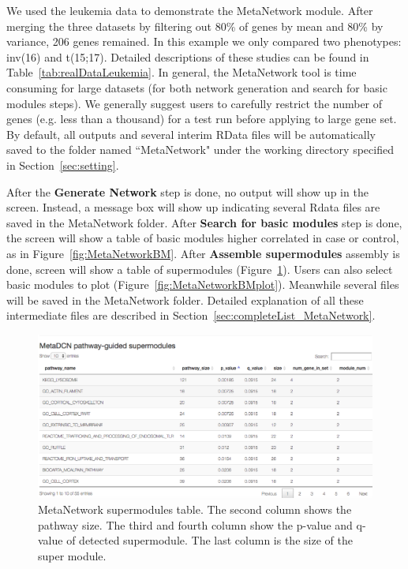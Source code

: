 We used the leukemia data to demonstrate the MetaNetwork module.
After merging the three datasets by filtering out 80\% of genes by mean and 80\% by variance, 206 genes remained.
In this example we only compared two phenotypes: inv(16) and t(15;17).
Detailed descriptions of these studies can be found in Table~\ref{tab:realDataLeukemia}. 
In general, the MetaNetwork tool is time consuming for large datasets (for both network generation and search for basic modules steps).
We generally suggest users to carefully restrict the number of genes (e.g. less than a thousand) for a test run before applying to large gene set.
By default, all outputs and several interim RData files will be automatically saved to the folder named ``MetaNetwork" under the working directory specified in Section~\ref{sec:setting}.




After the  \textbf{Generate Network} step is done, 
no output will show up in the screen. Instead, a message box will show up indicating several Rdata files are saved in the MetaNetwork folder. 
After \textbf{Search for basic modules} step is done, the screen will show a table of basic modules higher correlated in case or control, 
as in Figure~\ref{fig:MetaNetworkBM}. 
After \textbf{Assemble supermodules} assembly is done, screen will show a table of supermodules (Figure~\ref{fig:MetaNetworksuper}). 
Users can also select basic modules to plot (Figure~\ref{fig:MetaNetworkBMplot}). 
Meanwhile several files will be saved in the MetaNetwork folder.
Detailed explanation of all these intermediate files are described in Section~\ref{sec:completeList_MetaNetwork}.

\begin{figure}[H]
\begin{center}
\includegraphics[scale=0.3]{./figure/MetaNetwork/MetaNetworksuper.png}
\caption{MetaNetwork supermodules table.
The second column shows the pathway size.
The third and fourth column show the p-value and q-value of detected supermodule.
The last column is the size of the super module.
}
\label{fig:MetaNetworksuper}
\end{center}
\end{figure}

